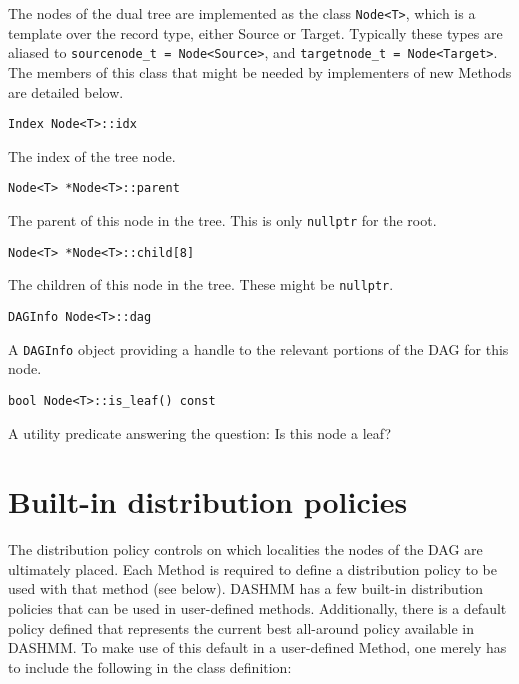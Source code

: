 The nodes of the dual tree are implemented as the class \texttt{Node<T>}, which
is a template over the record type, either Source or Target. Typically these
types are aliased to \texttt{sourcenode\_t = Node<Source>}, and
\texttt{targetnode\_t = Node<Target>}. The members of this class that might be
needed by implementers of new Methods are detailed below.

\begin{lstlisting}
Index Node<T>::idx
\end{lstlisting}

\noindent The index of the tree node.

\begin{lstlisting}
Node<T> *Node<T>::parent
\end{lstlisting}

\noindent The parent of this node in the tree. This is only \texttt{nullptr} for
the root.

\begin{lstlisting}
Node<T> *Node<T>::child[8]
\end{lstlisting}

\noindent The children of this node in the tree. These might be
\texttt{nullptr}.

\begin{lstlisting}
DAGInfo Node<T>::dag
\end{lstlisting}

\noindent A \texttt{DAGInfo} object providing a handle to the relevant portions
of the DAG for this node.

\begin{lstlisting}
bool Node<T>::is_leaf() const
\end{lstlisting}

\noindent A utility predicate answering the question: Is this node a leaf?


\section{Built-in distribution policies}

The distribution policy controls on which localities the nodes of the DAG
are ultimately placed. Each Method is required to define a distribution policy
to be used with that method (see below). DASHMM has a few built-in distribution
policies that can be used in user-defined methods. Additionally, there is a
default policy defined that represents the current best all-around policy
available in DASHMM. To make use of this default in a user-defined Method,
one merely has to include the following in the class definition:

